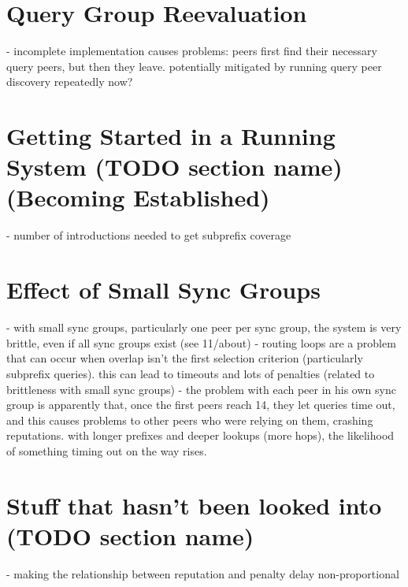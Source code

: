 \section{Query Group Reevaluation}
- incomplete implementation causes problems: peers first find their necessary
  query peers, but then they leave. potentially mitigated by running query peer
  discovery repeatedly now?

\section{Getting Started in a Running System (TODO section name) (Becoming
Established)}
- number of introductions needed to get subprefix coverage

\section{Effect of Small Sync Groups}
- with small sync groups, particularly one peer per sync group, the system is
  very brittle, even if all sync groups exist (see 11/about)
- routing loops are a problem that can occur when overlap isn't the first
  selection criterion (particularly subprefix queries). this can lead to
  timeouts and lots of penalties (related to brittleness with small sync groups)
- the problem with each peer in his own sync group is apparently that, once the
  first peers reach 14, they let queries time out, and this causes problems to
  other peers who were relying on them, crashing reputations. with longer
  prefixes and deeper lookups (more hops), the likelihood of something timing
  out on the way rises.

\section{Stuff that hasn't been looked into (TODO section name)}
- making the relationship between reputation and penalty delay non-proportional


